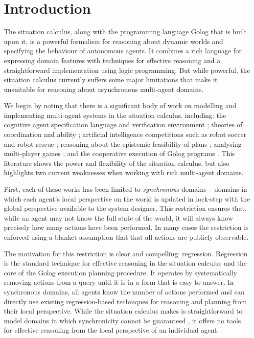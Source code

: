 

\chapter{Introduction}

\label{ch:intro}

The situation calculus, along with the programming language Golog
that is built upon it, is a powerful formalism for reasoning about
dynamic worlds and specifying the behaviour of autonomous agents.
It combines a rich language for expressing domain features with techniques
for effective reasoning and a straightforward implementation using
logic programming. But while powerful, the situation calculus currently
suffers some major limitations that make it unsuitable for reasoning
about asynchronous multi-agent domains.

We begin by noting that there is a significant body of work on modelling
and implementing multi-agent systems in the situation calculus, including:
the cognitive agent specification language and verification environment
\citep{shapiro02casl}; theories of coordination and ability \citep{ghaderi07sc_joint_ability};
artificial intelligence competitions such as robot soccer \citep{Ferrein2005readylog}
and robot rescue \citep{farinelli07team_golog}; reasoning about the
epistemic feasibility of plans \citep{Lesperance01epi_feas_casl};
analysing multi-player games \citep{delgrande01sitcalc_cleudo}; and
the cooperative execution of Golog programs \citep{Ferrein2005readylog,kelly06hlp_dps}.
This literature shows the power and flexibility of the situation calculus,
but also highlights two current weaknesses when working with rich
multi-agent domains.

First, each of these works has been limited to \emph{synchronous}
domains -- domains in which each agent's local perspective on the
world is updated in lock-step with the global perspective available
to the system designer. This restriction ensures that, while an agent
may not know the full state of the world, it will always know precisely
how many actions have been performed. In many cases the restriction
is enforced using a blanket assumption that that all actions are publicly
observable.

The motivation for this restriction is clear and compelling: regression.
Regression is the standard technique for effective reasoning in the
situation calculus and the core of the Golog execution planning procedure.
It operates by systematically removing actions from a query until
it is in a form that is easy to answer. In synchronous domains, all
agents know the number of actions performed and can directly use existing
regression-based techniques for reasoning and planning from their
local perspective. While the situation calculus makes is straightforward
to model domains in which synchronicity cannot be guaranteed \citep{Lesperance99sitcalc_approach},
it offers no tools for effective reasoning from the local perspective
of an individual agent.

